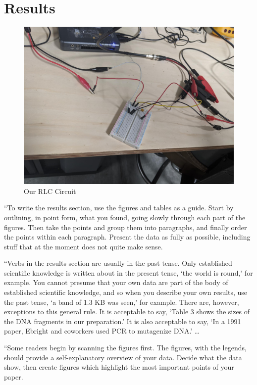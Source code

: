 \documentclass[10pt,twocolumn]{article}
\begin{document}
\section{Results}
\label{sec:results}

\begin{figure}[bt]
	\centering
	\includegraphics[width=.9\linewidth]{figures/RLCcircuit.PNG}
	\caption{Our RLC Circuit}
	\label{fig:diagram2}
\end{figure}
``To write the results section, use the figures and tables as a guide. Start by outlining, in point form, what you found, going slowly through each part of the figures. Then take the points and group them into paragraphs, and finally order the points within each paragraph. Present the data as fully as possible, including stuff that at the moment does not quite make sense.

``Verbs in the results section are usually in the past tense. Only established scientific knowledge is written about in the present tense, `the world is round,' for example. You cannot presume that your own data are part of the body of established scientific knowledge, and so when you describe your own results, use the past tense, `a band of 1.3 KB was seen,' for example. There are, however, exceptions to this general rule. It is acceptable to say, `Table 3 shows the sizes of the DNA fragments in our preparation.' It is also acceptable to say, `In a 1991 paper, Ebright and coworkers used PCR to mutagenize DNA.' \ldots

``Some readers begin by scanning the figures first. The figures, with the legends, should provide a self-explanatory overview of your data. Decide what the data show, then create figures which highlight the most important points of your paper.
\end{document}
